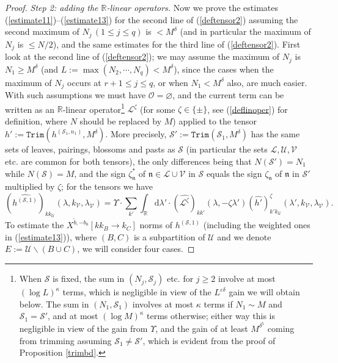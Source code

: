 \documentclass[11 pt,reqno]{amsart}
\theoremstyle{definition}
\theoremstyle{remark}
\numberwithin{equation}{section}
\newcommand{\Sc}{\mathcal{S}}
\newcommand{\Lc}{\mathcal{L}}
\newcommand{\Uc}{\mathcal{U}}
\newcommand{\Vc}{\mathcal{V}}
\newcommand{\Rb}{\mathbb{R}}
\newcommand{\nf}{\mathfrak{n}}
\newcommand{\Os}{\mathscr{O}}
\newcommand{\Ls}{\mathscr{L}}
\begin{document}
{\begin{proof}
\emph{Step 2: adding the $\Rb$-linear operators.} Now we prove the estimates (\ref{estimate11})--(\ref{estimate13}) for the second line of (\ref{deftensor2}) assuming the second maximum of $N_j\,(1\leq j\leq q)$ is $<M^\delta$ (and in particular the maximum of $N_j$ is $\leq N/2$), and the same estimates for the third line of (\ref{deftensor2}). First look at the second line of (\ref{deftensor2}); we may assume the maximum of $N_j$ is $N_1\geq M^\delta$ (and $L:=\max(N_2,\cdots,N_q)<M^\delta$), since the cases when the maximum of $N_j$ occurs at $r+1\leq j\leq q$, or when $N_1<M^\delta$ also, are much easier. With such assumptions we must have $\Os=\varnothing$, and the current term can be written as an $\Rb$-linear operator\footnote{When $\Sc$ is fixed, the sum in $(N_j,\Sc_j)$ etc. for $j\geq 2$ involve at most $(\log L)^{\kappa}$ terms, which is negligible in view of the $L^{\varepsilon\delta}$ gain we will obtain below. The sum in $(N_1,\Sc_1)$ involves at most $\kappa$ terms if $N_1\sim M$ and $\Sc_1=\Sc'$, and at most $(\log M)^{\kappa}$ terms otherwise; either way this is negligible in view of the gain from $\Upsilon$, and the gain of at least $M^{\delta^5}$ coming from trimming assuming $\Sc_1\neq\Sc'$, which is evident from the proof of Proposition \ref{trimbd}.} $\Ls^\zeta$ (for some $\zeta\in\{\pm\}$, see (\ref{deflinoper}) for definition, where $N$ should be replaced by $M$) applied to the tensor $h':=\mathtt{Trim}(h^{(\Sc_1,n_1)},M^\delta)$. More precisely, $\Sc':=\mathtt{Trim}(\Sc_1,M^\delta)$ has the same sets of leaves, pairings, blossoms and pasts as $\Sc$ (in particular the sets $\Lc,\Uc,\Vc$ etc. are common for both tensors), the only differences being that $N(\Sc')=N_1$ while $N(\Sc)=M$, and the sign $\zeta_\nf^*$ of $\nf\in\Lc\cup\Vc$ in $\Sc$ equals the sign $\zeta_\nf$ of $\nf$ in $\Sc'$ multiplied by $\zeta$; for the tensors we have
\begin{equation}\label{tensoroperator}(\widehat{h^{(\Sc,1)}})_{kk_\Uc}(\lambda,k_\Vc,\lambda_\Vc)=\Upsilon\cdot\sum_{k'}\int_\Rb\mathrm{d}\lambda'\cdot(\widehat{\Ls^\zeta})_{kk'}(\lambda,-\zeta\lambda')(\widehat{h'})_{k'k_\Uc}^\zeta(\lambda',k_\Vc,\lambda_\Vc).
\end{equation} 
To estimate the $X^{\widetilde{b},-b_0}[kk_B\to k_C]$ norms of $h^{(\Sc,1)}$ (including the weighted ones in (\ref{estimate13})), where $(B,C)$ is a subpartition of $\Uc$ and we denote $E:=\Uc\backslash(B\cup C)$, we will consider four cases.


\end{proof}}
\end{document}
